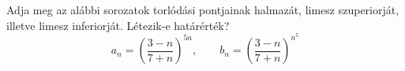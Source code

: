 \documentclass[11pt]{scrartcl}
\begin{document}
Adja meg az alábbi sorozatok torlódási pontjainak halmazát, limesz
szuperiorját, illetve limesz inferiorját. Létezik-e határérték?
\[
	a_n = \left(\frac{3 - n}{7 + n}\right)^{5n}, \qquad
	b_n = \left(\frac{3 - n}{7 + n}\right)^{n^5}
\]
\end{document}
